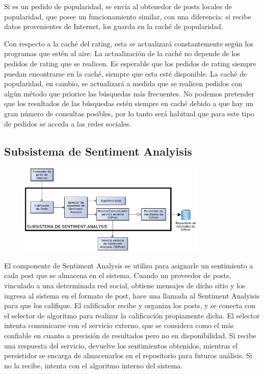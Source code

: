 Si es un pedido de popularidad, se envía al obtenedor de posts locales de popularidad, que posee un funcionamiento similar, con una diferencia: si recibe datos provenientes de Internet, los guarda en la caché de popularidad.

Con respecto a la caché del rating, esta se actualizará constantemente según los programas que estén al aire. La actualización de la caché no depende de los pedidos de rating que se realicen. Es esperable que los pedidos de rating siempre puedan encontrarse en la caché, siempre que esta esté disponible.
La caché de popularidad, en cambio, se actualizará a medida que se realicen pedidos con algún método que priorice las búsquedas más frecuentes. No podemos pretender que los resultados de las búsquedas estén siempre en caché debido a que hay un gran número de consultas posibles, por lo tanto será habitual que para este tipo de pedidos se acceda a las redes sociales. 

\subsection{Subsistema de Sentiment Analyisis}

\begin{figure}[H]
\centering
\includegraphics[width=0.8\textwidth]{graph/subsistemaSentimentAnalysis.pdf}
\end{figure}

El componente de Sentiment Analysis se utiliza para asignarle un sentimiento a cada post que se almacena en el sistema. Cuando un proveedor de posts, vinculado a una determinada red social, obtiene mensajes de dicho sitio y los ingresa al sistema en el formato de post, hace una llamada al Sentiment Analyisis para que los califique. El calificador recibe y organiza los posts, y se conecta con el selector de algoritmo para realizar la calificación propiamente dicha. El selector intenta comunicarse con el servicio externo, que se considera como el más confiable en cuanto a precisión de resultados pero no en disponibilidad. Si recibe una respuesta del servicio, devuelve los sentimientos obtenidos, mientras el persistidor se encarga de almacenarlos en el repositorio para futuros análisis. Si no la recibe, intenta con el algoritmo interno del sistema.

